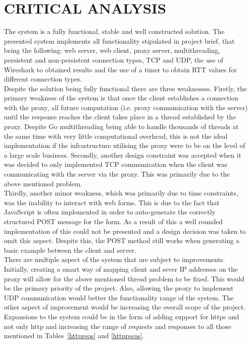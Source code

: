\documentclass[10pt,twocolumn]{witseiepaper}
\begin{document}
\section{CRITICAL ANALYSIS}
		
		The system is a fully functional, stable and well constructed solution. The presented system implements all functionality stipulated in project brief, that being the following: web server, web client, proxy server, multithreading, persistent and non-persistent connection types, TCP and UDP, the use of Wireshark to obtained results and the use of a timer to obtain RTT values for different connection types. \\

		Despite the solution being fully functional there are three weaknesses. Firstly, the primary weakness of the system is that once the client establishes a connection with the proxy, all future computation (i.e. proxy communication with the server) until the response reaches the client takes place in a thread established by the proxy. Despite Go multithreading being able to handle thousands of threads at the same time with very little computational overhead, this is not the ideal implementation if the infrastructure utilising the proxy were to be on the level of a large scale business. Secondly, another design constraint was accepted when it was decided to only implemented TCP communication when the client was communicating with the server via the proxy. This was primarily due to the above mentioned problem. \\
		
		Thirdly, another minor weakness, which was primarily due to time constraints, was the inability to interact with web forms. This is due to the fact that JavaScript is often implemented in order to auto-generate the correctly structured POST message for the form. As a result of this a well rounded implementation of this could not be presented and a design decision was taken to omit this aspect. Despite this, the POST method still works when generating a basic example between the client and server.  \\
		
		There are multiple aspect of the system that are subject to improvements. Initially, creating a smart way of mapping client and sever IP addresses on the proxy will allow for the above mentioned thread problem to be fixed. This would be the primary priority of the project. Also, allowing the proxy to implement UDP communication would better the functionality range of the system. The other aspect of improvement would be increasing the overall scope of the project. Expansions to the system could be in the form of adding support for https and not only http and increasing the range of requests and responses to all those mentioned in Tables~\ref{httpreqs} and \ref{httpresps}.
	
\end{document}
